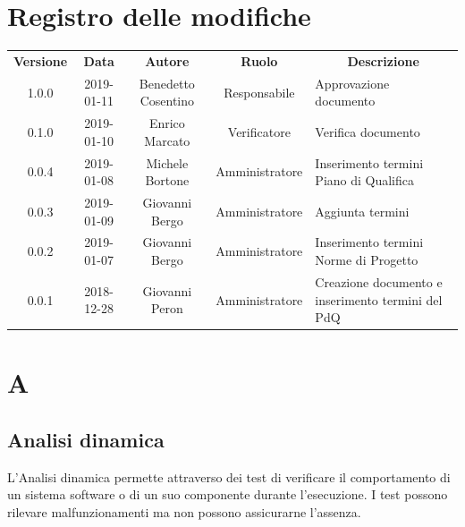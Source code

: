 \renewcommand {\footrulewidth}{0.2mm}

\usepackage{lipsum}

	
	\newpage
	\section*{\centering Registro delle modifiche}
	\begin{tabularx}{\textwidth}{ c | c | c | c | X }
		\rowcolor{LightBlue}
		\color{white}\bfseries Versione & \color{white}\bfseries Data & \color{white}\bfseries Autore & \color{white}\bfseries Ruolo & \multicolumn{1}{c}{\color{white}\bfseries Descrizione}\\[0.25cm]
		1.0.0 & 2019-01-11 & Benedetto Cosentino & Responsabile & Approvazione documento \\ 
		\hline
		0.1.0 & 2019-01-10 & Enrico Marcato & Verificatore & Verifica documento \\ 
		\hline
		0.0.4 & 2019-01-08 & Michele Bortone & Amministratore & Inserimento termini Piano di Qualifica \\ 
		\hline 
		0.0.3 & 2019-01-09 & Giovanni Bergo & Amministratore & Aggiunta termini \\ 
		\hline 
		0.0.2 & 2019-01-07 & Giovanni Bergo & Amministratore & Inserimento termini Norme di Progetto \\ 
		\hline 
		0.0.1 & 2018-12-28 & Giovanni Peron & Amministratore & Creazione documento e \newline inserimento termini del PdQ \\ 
		\hline
	
	\end{tabularx}
	\newpage
	\setcounter{secnumdepth}{0}
	
	
	\printindex
	\newpage
	\section{A}
	\subsection{Analisi dinamica} 
	L'Analisi dinamica permette attraverso dei test di verificare il comportamento di un sistema software o di un suo componente durante l'esecuzione. I test possono rilevare malfunzionamenti ma non possono assicurarne l'assenza.
	
